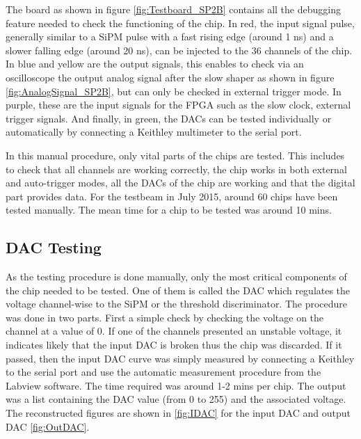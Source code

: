 The board as shown in figure \ref{fig:Testboard_SP2B} contains all the debugging feature needed to check the functioning of the chip. In red, the input signal pulse, generally similar to a SiPM pulse with a fast rising edge (around 1 ns) and a slower falling edge (around 20 ns), can be injected to the 36 channels of the chip. In blue and yellow are the output signals, this enables to check via an oscilloscope the output analog signal after the slow shaper as shown in figure \ref{fig:AnalogSignal_SP2B}, but can only be checked in external trigger mode. In purple, these are the input signals for the FPGA such as the slow clock, external trigger signals. And finally, in green, the DACs can be tested individually or automatically by connecting a Keithley multimeter to the serial port.

In this manual procedure, only vital parts of the chips are tested. This includes to check that all channels are working correctly, the chip works in both external and auto-trigger modes, all the DACs of the chip are working and that the digital part provides data. For the testbeam in July 2015, around 60 chips have been tested manually. The mean time for a chip to be tested was around 10 mins.

\subsection{DAC Testing}

As the testing procedure is done manually, only the most critical components of the chip needed to be tested. One of them is called the DAC which regulates the voltage channel-wise to the SiPM or the threshold discriminator. The procedure was done in two parts. First a simple check by checking the voltage on the channel at a value of 0. If one of the channels presented an unstable voltage, it indicates likely that the input DAC is broken thus the chip was discarded. If it passed, then the input DAC curve was simply measured by connecting a Keithley to the serial port and use the automatic measurement procedure from the Labview software. The time required was around 1-2 mins per chip. The output was a list containing the DAC value (from 0 to 255) and the associated voltage. The reconstructed figures are shown in \ref{fig:IDAC} for the input DAC and output DAC \ref{fig:OutDAC}.

